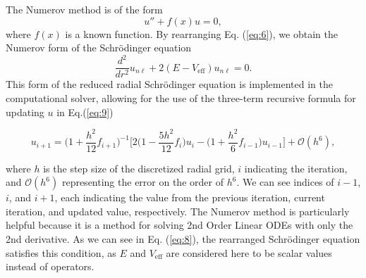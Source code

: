 \documentclass[%
 reprint,
nofootinbib,
 amsmath,amssymb,
 aps,
floatfix,
]{revtex4-2}
\begin{document}
{  The Numerov method is of the form 
  \begin{equation}
    u'' + f(x) u = 0, \label{eq:7}
  \end{equation}
  where $f(x)$ is a known function.
  By rearranging Eq. (\ref{eq:6}), we obtain the Numerov form of the Schr\"odinger equation
  \begin{equation}
    \frac{d^2}{dr^2} u_{n\ell} + 2(E - V_{\text{eff}}) u_{n\ell} = 0. \label{eq:8}
  \end{equation}
  This form of the reduced radial Schr\"odinger equation is implemented in the computational solver, allowing for the use of the three-term recursive formula for updating $u$ in Eq.(\ref{eq:9})
  \begin{widetext}
  \begin{equation}
    u_{i+1} = \Big(1 + \frac{h^2}{12}f_{i+1} \Big)^{-1} \Big[2 \Big(1 - \frac{5 h^2}{12}f_i \Big)u_i - \Big(1 + \frac{h^2}{6}f_{i-1} \Big)u_{i-1}\Big] + \mathcal{O}(h^6), \label{eq:9}
  \end{equation}
  \end{widetext}
  where $h$ is the step size of the discretized radial grid, $i$ indicating the iteration, and $\mathcal{O}(h^6)$ representing the error on the order of $h^6$. 
  We can see indices of $i-1$, $i$, and $i+1$, each indicating the value from the previous iteration, current iteration, and updated value, respectively. 
  The Numerov method is particularly helpful because it is a method for solving 2nd Order Linear ODEs with only the 2nd derivative. 
  As we can see in Eq. (\ref{eq:8}), the rearranged Schr\"odinger equation satisfies this condition, as $E$ and $V_{\text{eff}}$ are considered here to be scalar values instead of operators. 
}

\end{document}
